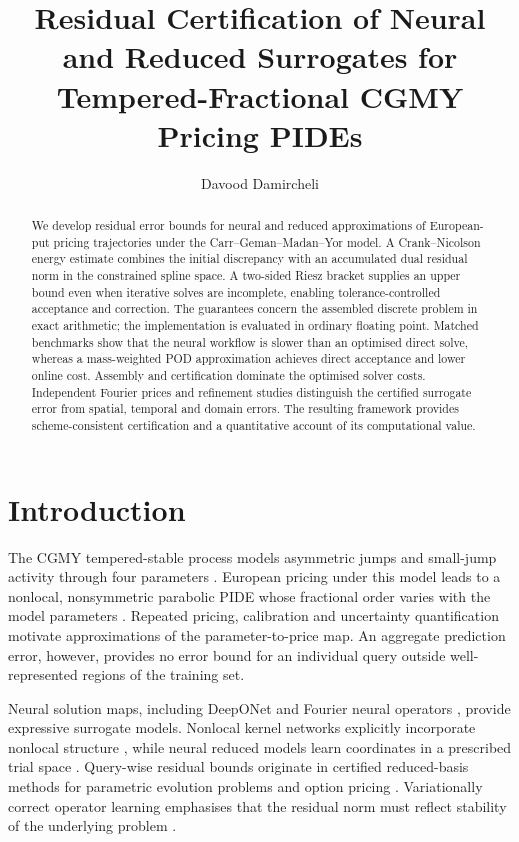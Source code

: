 \documentclass[11pt]{amsart}
\title[Residual Certification for CGMY Pricing Trajectories]
      {Residual Certification of Neural and Reduced Surrogates for\\ Tempered-Fractional CGMY Pricing PIDEs}
\author{Davood Damircheli}
\date{}
\theoremstyle{remark}
\begin{document}
\begin{abstract}
We develop residual error bounds for neural and reduced approximations of
European-put pricing trajectories under the Carr--Geman--Madan--Yor model.
A Crank--Nicolson energy estimate combines the initial discrepancy with an
accumulated dual residual norm in the constrained spline space. A two-sided
Riesz bracket supplies an upper bound even when iterative solves are
incomplete, enabling tolerance-controlled acceptance and correction.
The guarantees concern the assembled discrete problem in exact arithmetic;
the implementation is evaluated in ordinary floating point.
Matched benchmarks show that the neural workflow is slower than an
optimised direct solve, whereas a mass-weighted POD approximation achieves
direct acceptance and lower online cost. Assembly and certification dominate
the optimised solver costs. Independent Fourier prices and refinement
studies distinguish the certified surrogate error from spatial, temporal
and domain errors. The resulting framework provides scheme-consistent
certification and a quantitative account of its computational value.
\end{abstract}
\maketitle

\section{Introduction}
\label{sec:introduction}
The CGMY tempered-stable process models asymmetric jumps and small-jump
activity through four parameters \cite{CarrGemanMadanYor2002}. European
pricing under this model leads to a nonlocal, nonsymmetric parabolic PIDE
whose fractional order varies with the model parameters
\cite{CarteadelCastilloNegrete2007}. Repeated pricing, calibration and
uncertainty quantification motivate approximations of the parameter-to-price
map. An aggregate prediction error, however, provides no error bound for an
individual query outside well-represented regions of the training set.

Neural solution maps, including DeepONet \cite{LuJinPangZhangKarniadakis2021}
and Fourier neural operators \cite{LiKovachkiEtAl2021,KovachkiEtAl2023},
provide expressive surrogate models. Nonlocal kernel networks explicitly
incorporate nonlocal structure \cite{YouYuDEliaGaoSilling2022}, while neural
reduced models learn coordinates in a prescribed trial space
\cite{HesthavenUbbiali2018,BhattacharyaEtAl2021}. Query-wise residual bounds
originate in certified reduced-basis methods for parametric evolution
problems \cite{GreplPatera2005,RozzaHuynhPatera2008,HaasdonkOhlberger2008}
and option pricing \cite{ContLantosPironneau2011}. Variationally correct
operator learning emphasises that the residual norm must reflect stability
of the underlying problem \cite{QiuDahmenChen2026}.
\end{document}
